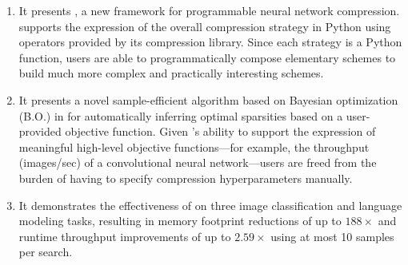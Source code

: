 \begin{enumerate}
    \item It presents \algoName, a new framework for programmable neural network compression. \algoName supports the expression of
the overall compression strategy in Python using operators provided by its compression library. 
%
Since each strategy is a Python function, users are  
able to programmatically compose elementary schemes to build much
more complex and practically interesting schemes.

\item It presents a novel sample-efficient algorithm based on Bayesian optimization (B.O.) in \algoName for automatically inferring optimal sparsities based on a user-provided objective function. Given \algoName's ability to support the expression of meaningful high-level
objective functions---for example, the throughput (images/sec) of a convolutional neural network---users
are freed from the burden of having to specify compression hyperparameters manually.

\item It demonstrates the effectiveness of \algoName on three image classification and language modeling tasks, resulting in memory footprint reductions of up to $188\times$ and runtime throughput improvements of up to $2.59\times$ using at most 10 samples per search.
\end{enumerate}